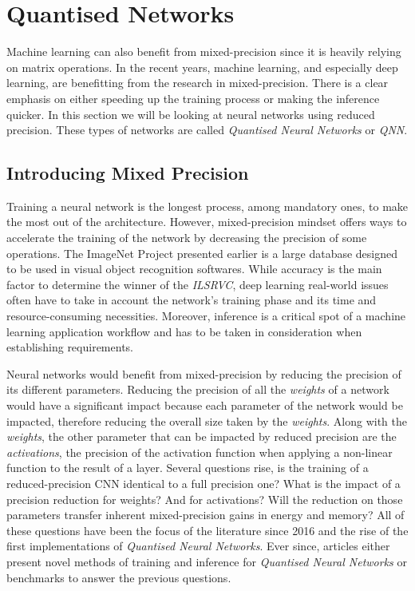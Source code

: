 \section{Quantised Networks}

Machine learning can also benefit from mixed-precision since it is heavily relying on matrix operations. In the recent years, machine learning, and especially deep learning, are benefitting from the research in mixed-precision. There is a clear emphasis on either speeding up the training process or making the inference quicker. In this section we will be looking at neural networks using reduced precision. These types of networks are called \emph{Quantised Neural Networks} or \emph{QNN}.


\subsection{Introducing Mixed Precision}

Training a neural network is the longest process, among mandatory ones, to make the most out of the architecture. However, mixed-precision mindset offers ways to accelerate the training of the network by decreasing the precision of some operations. The ImageNet Project \cite{ImageNet2009} presented earlier is a large database designed to be used in visual object recognition softwares. While accuracy is the main factor to determine the winner of the \emph{ILSRVC}, deep learning real-world issues often have to take in account the network's training phase and its time and resource-consuming necessities. Moreover, inference is a critical spot of a machine learning application workflow and has to be taken in consideration when establishing requirements.

Neural networks would benefit from mixed-precision by reducing the precision of its different parameters. Reducing the precision of all the \emph{weights} of a network would have a significant impact because each parameter of the network would be impacted, therefore reducing the overall size taken by the \emph{weights}. Along with the \emph{weights}, the other parameter that can be impacted by reduced precision are the \emph{activations}, the precision of the activation function when applying a non-linear function to the result of a layer. Several questions rise, is the training of a reduced-precision CNN identical to a full precision one? What is the impact of a precision reduction for weights? And for activations? Will the reduction on those parameters transfer inherent mixed-precision gains in energy and memory? All of these questions have been the focus of the literature since 2016 and the rise of the first implementations of \emph{Quantised Neural Networks}. Ever since, articles either present novel methods of training and inference for \emph{Quantised Neural Networks} or benchmarks to answer the previous questions.

